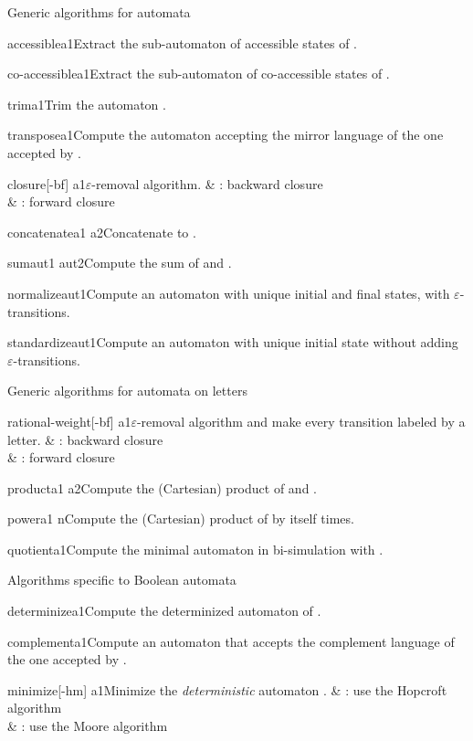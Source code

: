 \begin{fnsection}{Generic algorithms for automata}
\item{accessible}{a1}{Extract the sub-automaton of accessible states
    of .}
\item{co-accessible}{a1}{Extract the sub-automaton of co-accessible
    states of .}
\item{trim}{a1}{Trim the automaton .}
\item{transpose}{a1}{Compute the automaton accepting the mirror
    language of the one accepted by .}

\item{closure}{[-bf] a1}{$\varepsilon$-removal algorithm.}
  &  : backward closure\\
  &  : forward closure\\
\item{concatenate}{a1 a2}{Concatenate  to .}
\item{sum}{aut1 aut2}{Compute the sum of  and .}
\item{normalize}{aut1}{Compute an automaton with unique initial and
    final states, with $\varepsilon$-transitions.}
\item{standardize}{aut1}{Compute an automaton with unique initial
    state without adding $\varepsilon$-transitions.}  \hline
\end{fnsection}

\begin{fnsection}{Generic algorithms for automata on letters}
\item{rational-weight}{[-bf] a1}{$\varepsilon$-removal algorithm and make
    every transition labeled by a letter.}
  &  : backward closure\\
  &  : forward closure\\
\item{product}{a1 a2}{Compute the (Cartesian) product of  and
    .}
\item{power}{a1 n}{Compute the (Cartesian) product of  by
    itself  times.}
\item{quotient}{a1}{Compute the minimal automaton in bi-simulation
    with .}  \hline
\end{fnsection}

\begin{fnsection}{Algorithms specific to Boolean automata}
\item{determinize}{a1}{Compute the determinized automaton of
    .}
\item{complement}{a1}{Compute an automaton that accepts the complement
    language of the one accepted by .}
\item{minimize}{[-hm] a1}{Minimize the {\em deterministic} automaton
    .}
  &  : use the Hopcroft algorithm\\
  &  : use the Moore algorithm\\
  \hline
\end{fnsection}

